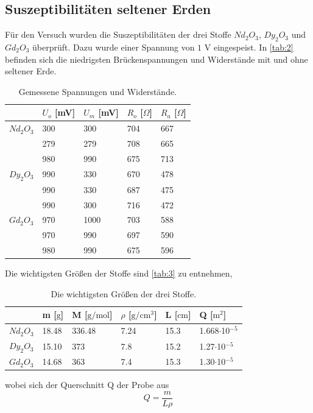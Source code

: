\subsection{Suszeptibilitäten seltener Erden}
Für den Versuch wurden die Suszeptibilitäten der drei Stoffe $Nd_2 O_3$, $Dy_2 O_3$ und $Gd_2 O_3$ überprüft. Dazu wurde einer Spannung von $1$ V eingespeist. In \autoref{tab:2} befinden sich die niedrigsten Brückenspannungen und Widerstände mit und ohne seltener Erde.
\begin{table}[H]
  \centering
  \caption{Gemessene Spannungen und Widerstände.}
  \begin{tabular}{l|l|l|l|l}
  & $U_{o}$ [mV] & $U_{m}$ [mV] & $R_{o}$ [$\Omega$] & $R_{a}$ [$\Omega$]\\ \hline
  $Nd_2 O_3$ & 300 & 300 & 704 & 667\\
  & 279 & 279 & 708 & 665\\
  & 980 & 990 & 675 & 713\\ \hline
  $Dy_2 O_3$ & 990 & 330 & 670 & 478\\
  & 990 & 330 & 687 & 475\\
  & 990 & 300 & 716 & 472\\ \hline
  $Gd_2 O_3$ & 970 & 1000 & 703 & 588\\
  & 970 & 990 & 697 & 590\\
  & 980 & 990 & 675 & 596\\ \hline
  \end{tabular}
  \label{tab:2}
\end{table}
Die wichtigsten Größen der Stoffe sind \autoref{tab:3} zu entnehmen,
\begin{table}[H]
  \centering
  \caption{Die wichtigsten Größen der drei Stoffe.}
  \begin{tabular}{l|l|l|l|l|l}
  & m [$\mathrm{g}$] & M [$\mathrm{g/mol}$] & $\rho$ [$\mathrm{g/cm^3}$] & L [$\mathrm{cm}$] & Q [$\mathrm{m^2}$]\\ \hline
  $Nd_2 O_3$ & 18.48 & 336.48 & 7.24 & 15.3 & 1.668$\cdot$10$^{-5}$ \\ \hline
  $Dy_2 O_3$ & 15.10 & 373 & 7.8 & 15.2 & 1.27$\cdot$10$^{-5}$ \\ \hline
  $Gd_2 O_3$ & 14.68 & 363 & 7.4 & 15.3 & 1.30$\cdot$10$^{-5}$ \\ \hline
  \end{tabular}
  \label{tab:3}
\end{table}
wobei sich der Querschnitt Q der Probe aus 
\begin{equation*}
  Q=\frac{m}{L\rho}
\end{equation*}
